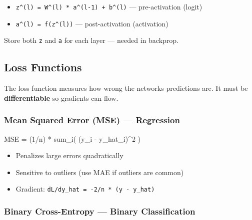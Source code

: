 \documentclass[11pt]{article}
\providecommand{\tightlist}{\setlength{\itemsep}{1pt}\setlength{\parskip}{0pt}}
\newenvironment{Shaded}{\begin{snugshade}}{\end{snugshade}}
\newcommand{\DecValTok}[1]{\textcolor[rgb]{0.96,0.45,0.00}{#1}}
\newcommand{\NormalTok}[1]{\textcolor[rgb]{0.81,0.81,0.76}{#1}}
\newcommand{\OperatorTok}[1]{\textcolor[rgb]{0.81,0.81,0.76}{#1}}
\begin{document}
\begin{itemize}
\tightlist
\item
  \texttt{z\^{}(l)\ =\ W\^{}(l)\ *\ a\^{}(l-1)\ +\ b\^{}(l)} --- pre-activation (logit)
\item
  \texttt{a\^{}(l)\ =\ f(z\^{}(l))} --- post-activation (activation)
\end{itemize}

Store both \texttt{z} and \texttt{a} for each layer --- needed in backprop.

\subsection{Loss Functions}\label{loss-functions}

The loss function measures how wrong the network\textquotesingle s predictions are. It must be \textbf{differentiable} so gradients can flow.

\subsubsection{Mean Squared Error (MSE) --- Regression}\label{mean-squared-error-mse--regression}


\begin{Shaded}
\begin{Highlighting}[]
\NormalTok{MSE }\OperatorTok{=}\NormalTok{ (}\DecValTok{1}\OperatorTok{/}\NormalTok{n) }\OperatorTok{*}\NormalTok{ sum\_i( (y\_i }\OperatorTok{{-}}\NormalTok{ y\_hat\_i)}\OperatorTok{\^{}}\DecValTok{2}\NormalTok{ )}
\end{Highlighting}
\end{Shaded}

\begin{itemize}
\tightlist
\item
  Penalizes large errors quadratically
\item
  Sensitive to outliers (use MAE if outliers are common)
\item
  Gradient: \texttt{dL/dy\_hat\ =\ -2/n\ *\ (y\ -\ y\_hat)}
\end{itemize}

\subsubsection{Binary Cross-Entropy --- Binary Classification}\label{binary-cross-entropy--binary-classification}

\setcodelang{}
\end{document}
